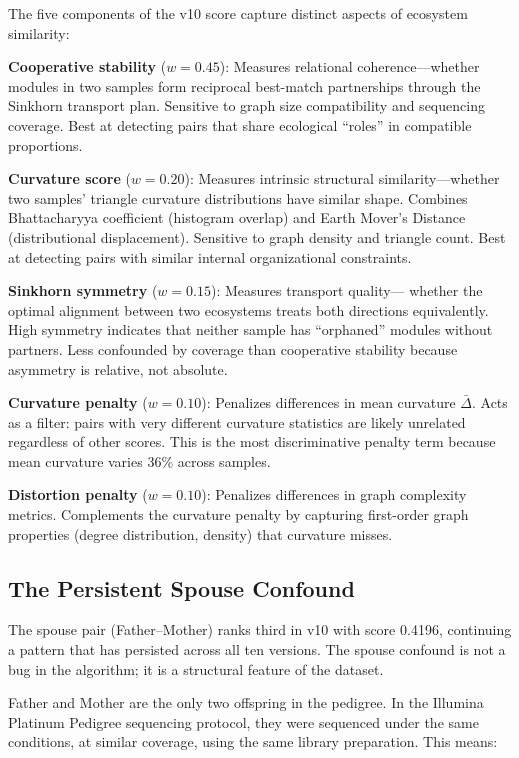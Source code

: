 \documentclass{../yalumba}
\begin{document}
The five components of the v10 score capture distinct aspects of
ecosystem similarity:

\textbf{Cooperative stability} ($w = 0.45$): Measures relational
coherence---whether modules in two samples form reciprocal best-match
partnerships through the Sinkhorn transport plan.  Sensitive to graph
size compatibility and sequencing coverage.  Best at detecting pairs
that share ecological ``roles'' in compatible proportions.

\textbf{Curvature score} ($w = 0.20$): Measures intrinsic structural
similarity---whether two samples' triangle curvature distributions have
similar shape.  Combines Bhattacharyya coefficient (histogram overlap)
and Earth Mover's Distance (distributional displacement).  Sensitive to
graph density and triangle count.  Best at detecting pairs with similar
internal organizational constraints.

\textbf{Sinkhorn symmetry} ($w = 0.15$): Measures transport quality---
whether the optimal alignment between two ecosystems treats both
directions equivalently.  High symmetry indicates that neither sample
has ``orphaned'' modules without partners.  Less confounded by coverage
than cooperative stability because asymmetry is relative, not absolute.

\textbf{Curvature penalty} ($w = 0.10$): Penalizes differences in mean
curvature $\bar\Delta$.  Acts as a filter: pairs with very different
curvature statistics are likely unrelated regardless of other scores.
This is the most discriminative penalty term because mean curvature
varies 36\% across samples.

\textbf{Distortion penalty} ($w = 0.10$): Penalizes differences in
graph complexity metrics.  Complements the curvature penalty by capturing
first-order graph properties (degree distribution, density) that
curvature misses.

\subsection{The Persistent Spouse Confound}

The spouse pair (Father--Mother) ranks third in v10 with score 0.4196,
continuing a pattern that has persisted across all ten versions.  The
spouse confound is not a bug in the algorithm; it is a structural
feature of the dataset.

Father and Mother are the only two offspring in the pedigree.  In the
Illumina Platinum Pedigree sequencing protocol, they were sequenced
under the same conditions, at similar coverage, using the same
library preparation.  This means:
\end{document}
